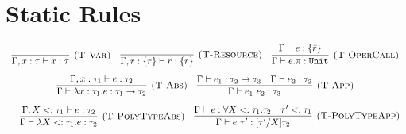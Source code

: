 \documentclass{llncs}
\newcommand{\keywadj}[1]{\mathtt{#1}}
\newcommand{\keyw}[1]{\keywadj{#1}~}
\newcommand{\kw}[1]{\keyw{ #1 }}
\newcommand{\kwa}[1]{\keywadj{ #1 }}
\begin{document}
\section{Static Rules}


\[
\begin{array}{c}


\infer[\textsc{(T-Var)}]
	{\Gamma, x: \tau \vdash x: \tau}
	{}
~~~
\infer[\textsc{(T-Resource)}]
	{\Gamma, r: \{ r \} \vdash r : \{ r \}}
	{}

~~~

\infer[\textsc{(T-OperCall)}]
	{\Gamma \vdash e.\pi: \kwa{Unit}}
	{\Gamma \vdash e: \{ \bar r \}} \\[2ex]
\infer[\textsc{(T-Abs)}]
	{\Gamma \vdash \lambda x: \tau_1.e : \tau_1 \rightarrow \tau_2}
	{\Gamma, x: \tau_1 \vdash e: \tau_2}
~~~

\infer[\textsc{(T-App)}]
	{\Gamma \vdash e_1~e_2: \tau_3}
	{\Gamma \vdash e_1: \tau_2 \rightarrow \tau_3 & \Gamma \vdash e_2: \tau_2}\\[2ex]
~~~
\infer[\textsc{(T-PolyTypeAbs)}]
	{\Gamma \vdash \lambda X <: \tau_1. e : \tau_2}
	{\Gamma, X <: \tau_1 \vdash e: \tau_2 }
~~~
\infer[\textsc{(T-PolyTypeApp)}]
	{\Gamma \vdash e~\tau' : [\tau'/X]\tau_2}
	{\Gamma \vdash e: \forall X <: \tau_1.\tau_2  & \tau' <: \tau_1  }

\end{array}
\]

\noindent
\fbox{$\hat \Gamma \vdash \hat e: \hat \tau~\kw{with} \varepsilon$}
\end{document}
